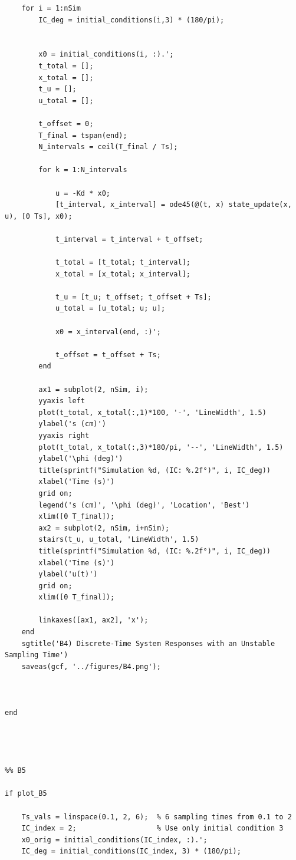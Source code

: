 \documentclass{article}
\begin{document}
\begin{verbatim}
    for i = 1:nSim
        IC_deg = initial_conditions(i,3) * (180/pi);


        x0 = initial_conditions(i, :).';
        t_total = [];
        x_total = [];
        t_u = []; 
        u_total = []; 
        
        t_offset = 0;
        T_final = tspan(end); 
        N_intervals = ceil(T_final / Ts);
        
        for k = 1:N_intervals

            u = -Kd * x0;
            [t_interval, x_interval] = ode45(@(t, x) state_update(x, u), [0 Ts], x0);
           
            t_interval = t_interval + t_offset;

            t_total = [t_total; t_interval];
            x_total = [x_total; x_interval];

            t_u = [t_u; t_offset; t_offset + Ts];
            u_total = [u_total; u; u];

            x0 = x_interval(end, :)';
        
            t_offset = t_offset + Ts;
        end
      
        ax1 = subplot(2, nSim, i);
        yyaxis left
        plot(t_total, x_total(:,1)*100, '-', 'LineWidth', 1.5)
        ylabel('s (cm)')
        yyaxis right
        plot(t_total, x_total(:,3)*180/pi, '--', 'LineWidth', 1.5)
        ylabel('\phi (deg)')
        title(sprintf("Simulation %d, (IC: %.2f°)", i, IC_deg))
        xlabel('Time (s)')
        grid on;
        legend('s (cm)', '\phi (deg)', 'Location', 'Best')
        xlim([0 T_final]); 
        ax2 = subplot(2, nSim, i+nSim);
        stairs(t_u, u_total, 'LineWidth', 1.5)
        title(sprintf("Simulation %d, (IC: %.2f°)", i, IC_deg))
        xlabel('Time (s)')
        ylabel('u(t)')
        grid on;
        xlim([0 T_final]);

        linkaxes([ax1, ax2], 'x');
    end
    sgtitle('B4) Discrete-Time System Responses with an Unstable Sampling Time')
    saveas(gcf, '../figures/B4.png');



end




%% B5

if plot_B5

    Ts_vals = linspace(0.1, 2, 6);  % 6 sampling times from 0.1 to 2
    IC_index = 2;                   % Use only initial condition 3
    x0_orig = initial_conditions(IC_index, :).';
    IC_deg = initial_conditions(IC_index, 3) * (180/pi);


\end{verbatim}
\end{document}
